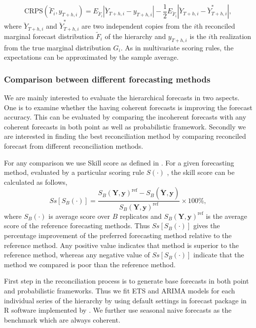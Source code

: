 \documentclass[graybox]{svmult}
\begin{document}
\begin{equation} \label{eq:24}
\text{CRPS}(\breve{F}_i,y_{T+h,i}) = E_{\breve{F}_i}|\breve{Y}_{T+h,i}-y_{T+h,i}| - \frac{1}{2}E_{\breve{F}_i}|\breve{Y}_{T+h,i}-\breve{Y}^*_{T+h,i}|,
\end{equation}
where $\breve{Y}_{T+h,i}$ and $\breve{Y}^*_{T+h,i}$ are two independent copies from the $i$th reconciled marginal forecast distribution $\tilde{F}_i$ of the hierarchy and $y_{T+h,i}$ is the $i$th realization from the true marginal distribution $G_i$. As in multivariate scoring rules, the expectations can be approximated by the sample average.

\subsubsection{Comparison between different forecasting methods}

We are mainly interested to evaluate the hierarchical forecasts in two aspects. One is to examine whether the having coherent forecasts is improving the forecast accuracy. This can be evaluated by comparing the incoherent forecasts with any coherent forecasts in both point as well as probabilistic framework. Secondly we are interested in finding the best reconciliation method by comparing reconciled forecast from different reconciliation methods.

For any comparison we use Skill score as defined in \citep{Gneiting2007}. For a given forecasting method, evaluated by a particular scoring rule $S(\cdot)$ , the skill score can be calculated as follows,
\begin{equation} \label{eq:25}
Ss[S_B(\cdot)] = \frac{S_B(\bm{Y},\bm{y})^{\text{ref}} - S_B(\breve{\bm{Y}},\bm{y})}{S_B(\bm{Y},\bm{y})^{\text{ref}}}\times 100\%,
\end{equation}
where $S_B(\cdot)$ is average score over $B$ replicates and $S_B(\bm{Y},\bm{y})^{\text{ref}}$ is the average score of the reference forecasting methods. Thus $Ss[S_B(\cdot)]$ gives the percentage improvement of the preferred forecasting method relative to the reference method. Any positive value indicates that method is superior to the reference method, whereas any negative value of $Ss[S_B(\cdot)]$ indicate that the method we compared is poor than the reference method.




First step in the reconciliation process is to generate base forecasts in both point and probabilistic frameworks. Thus we fit ETS and ARIMA models for each individual series of the hierarchy by using default settings in forecast package in R software implemented by \citep{Hyndman2018}. We further use seasonal naive forecasts as the benchmark which are always coherent.
\end{document}
